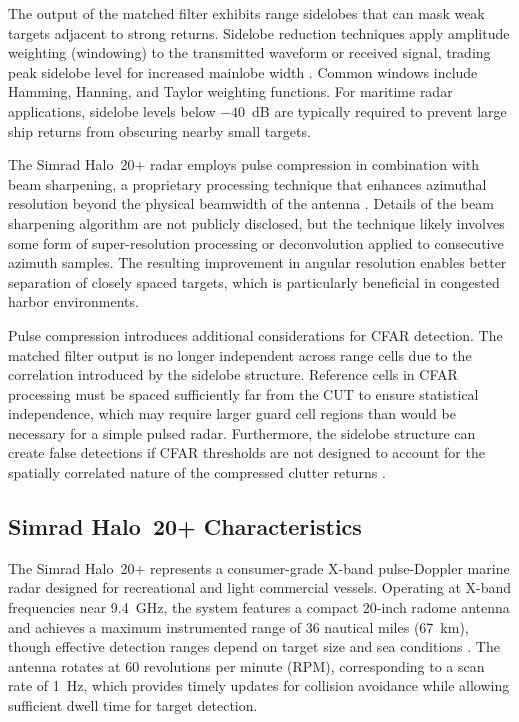 The output of the matched filter exhibits range sidelobes that can mask weak targets adjacent to strong returns. Sidelobe reduction techniques apply amplitude weighting (windowing) to the transmitted waveform or received signal, trading peak sidelobe level for increased mainlobe width \cite{Richards2022}. Common windows include Hamming, Hanning, and Taylor weighting functions. For maritime radar applications, sidelobe levels below $-40$~dB are typically required to prevent large ship returns from obscuring nearby small targets.

The Simrad Halo~20+ radar employs pulse compression in combination with beam sharpening, a proprietary processing technique that enhances azimuthal resolution beyond the physical beamwidth of the antenna \cite{AlSharabi2021}. Details of the beam sharpening algorithm are not publicly disclosed, but the technique likely involves some form of super-resolution processing or deconvolution applied to consecutive azimuth samples. The resulting improvement in angular resolution enables better separation of closely spaced targets, which is particularly beneficial in congested harbor environments.

Pulse compression introduces additional considerations for CFAR detection. The matched filter output is no longer independent across range cells due to the correlation introduced by the sidelobe structure. Reference cells in CFAR processing must be spaced sufficiently far from the CUT to ensure statistical independence, which may require larger guard cell regions than would be necessary for a simple pulsed radar. Furthermore, the sidelobe structure can create false detections if CFAR thresholds are not designed to account for the spatially correlated nature of the compressed clutter returns \cite{Alsalem2023}.

\subsection{Simrad Halo~20+ Characteristics}

The Simrad Halo~20+ represents a consumer-grade X-band pulse-Doppler marine radar designed for recreational and light commercial vessels. Operating at X-band frequencies near 9.4~GHz, the system features a compact 20-inch radome antenna and achieves a maximum instrumented range of 36 nautical miles (67~km), though effective detection ranges depend on target size and sea conditions \cite{AlSharabi2021}. The antenna rotates at 60 revolutions per minute (RPM), corresponding to a scan rate of 1~Hz, which provides timely updates for collision avoidance while allowing sufficient dwell time for target detection.

